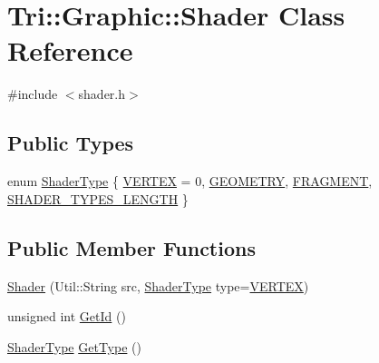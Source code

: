 \hypertarget{class_tri_1_1_graphic_1_1_shader}{}\section{Tri\+:\+:Graphic\+:\+:Shader Class Reference}
\label{class_tri_1_1_graphic_1_1_shader}


{\ttfamily \#include $<$shader.\+h$>$}

\subsection*{Public Types}
\begin{DoxyCompactItemize}
\item 
enum \hyperlink{class_tri_1_1_graphic_1_1_shader_aeab62c54cc59f0c320f7472448afb97f}{Shader\+Type} \{ \hyperlink{class_tri_1_1_graphic_1_1_shader_aeab62c54cc59f0c320f7472448afb97fa458cb07d7027cb526382fee27325f51e}{V\+E\+R\+T\+E\+X} = 0, 
\hyperlink{class_tri_1_1_graphic_1_1_shader_aeab62c54cc59f0c320f7472448afb97fa101467f5fbf54bb0daf68342d966a92a}{G\+E\+O\+M\+E\+T\+R\+Y}, 
\hyperlink{class_tri_1_1_graphic_1_1_shader_aeab62c54cc59f0c320f7472448afb97faee1493bc20b88ace58506d1a9f97169e}{F\+R\+A\+G\+M\+E\+N\+T}, 
\hyperlink{class_tri_1_1_graphic_1_1_shader_aeab62c54cc59f0c320f7472448afb97fae499d59eee09b29b493bb14ae6a42b99}{S\+H\+A\+D\+E\+R\+\_\+\+T\+Y\+P\+E\+S\+\_\+\+L\+E\+N\+G\+T\+H}
 \}
\end{DoxyCompactItemize}
\subsection*{Public Member Functions}
\begin{DoxyCompactItemize}
\item 
\hyperlink{class_tri_1_1_graphic_1_1_shader_a504dce2ef14fa3843a515f7a9c80182a}{Shader} (Util\+::\+String src, \hyperlink{class_tri_1_1_graphic_1_1_shader_aeab62c54cc59f0c320f7472448afb97f}{Shader\+Type} type=\hyperlink{class_tri_1_1_graphic_1_1_shader_aeab62c54cc59f0c320f7472448afb97fa458cb07d7027cb526382fee27325f51e}{V\+E\+R\+T\+E\+X})
\item 
unsigned int \hyperlink{class_tri_1_1_graphic_1_1_shader_a56632c4d1caa2355f4493bdffac3b67c}{Get\+Id} ()
\item 
\hyperlink{class_tri_1_1_graphic_1_1_shader_aeab62c54cc59f0c320f7472448afb97f}{Shader\+Type} \hyperlink{class_tri_1_1_graphic_1_1_shader_a3c361810896a57041ad48f7cc3b9cfef}{Get\+Type} ()
\end{DoxyCompactItemize}



